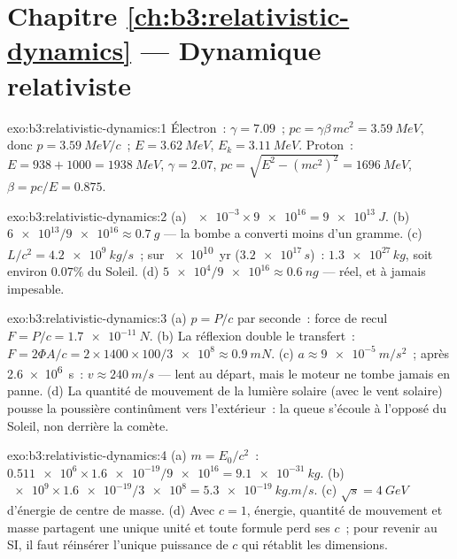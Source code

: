 \section*{Chapitre \ref{ch:b3:relativistic-dynamics} --- Dynamique relativiste}

\begin{solution}{exo:b3:relativistic-dynamics:1}
Électron~: $\gamma = 7.09$~; $pc = \gamma\beta\,mc^2 = \qty{3.59}{MeV}$,
donc $p = \qty{3.59}{MeV}/c$~; $E = \qty{3.62}{MeV}$, $E_k =
\qty{3.11}{MeV}$. Proton~: $E = 938 + 1000 = \qty{1938}{MeV}$, $\gamma
= 2.07$, $pc = \sqrt{E^2 - (mc^2)^2} = \qty{1696}{MeV}$, $\beta =
pc/E = 0.875$.
\end{solution}

\begin{solution}{exo:b3:relativistic-dynamics:2}
(a) $\num{e-3} \times \num{9e16} = \qty{9e13}{J}$. (b) $\num{6e13}/
\num{9e16} \approx \qty{0.7}{g}$ --- la bombe a converti moins d'un
gramme. (c) $L/c^2 = \qty{4.2e9}{kg/s}$~; sur \qty{e10}{yr}
($\num{3.2e17}{}\,\unit{s}$)~: $\num{1.3e27}{}\,\unit{kg}$, soit
environ $0.07\%$ du Soleil. (d) $\num{5e4}/\num{9e16} \approx
\qty{0.6}{ng}$ --- réel, et à jamais impesable.
\end{solution}

\begin{solution}{exo:b3:relativistic-dynamics:3}
(a) $p = P/c$ par seconde~: force de recul $F = P/c = \qty{1.7e-11}{N}$.
(b) La réflexion double le transfert~: $F = 2\Phi A/c =
2 \times 1400 \times 100/\num{3e8} \approx \qty{0.9}{mN}$. (c) $a
\approx \qty{9e-5}{m/s^2}$~; après \qty{2.6e6}{s}~: $v \approx
\qty{240}{m/s}$ --- lent au départ, mais le moteur ne tombe jamais en
panne. (d) La quantité de mouvement de la lumière solaire (avec le vent
solaire) pousse la poussière continûment vers l'extérieur~: la queue
s'écoule à l'opposé du Soleil, non derrière la comète.
\end{solution}

\begin{solution}{exo:b3:relativistic-dynamics:4}
(a) $m = E_0/c^2$~: $\num{0.511e6} \times \num{1.6e-19}/\num{9e16} =
\qty{9.1e-31}{kg}$. (b) $\num{e9} \times \num{1.6e-19}/\num{3e8} =
\qty{5.3e-19}{kg.m/s}$. (c) $\sqrt s = \qty{4}{GeV}$ d'énergie de
centre de masse. (d) Avec $c = 1$, énergie, quantité de mouvement et
masse partagent une unique unité et toute formule perd ses $c$~; pour
revenir au SI, il faut réinsérer l'unique puissance de $c$ qui rétablit
les dimensions.
\end{solution}

